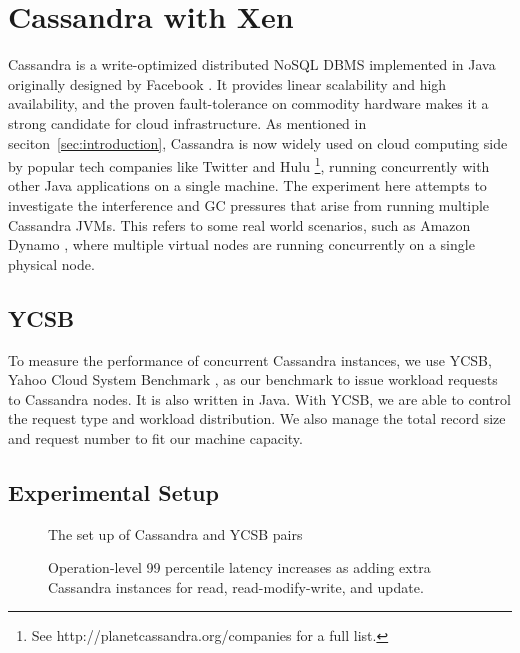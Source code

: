 \documentclass{sig-alternate}
\begin{document}
\section{Cassandra with Xen}

Cassandra is a write-optimized distributed NoSQL DBMS implemented in Java originally designed by Facebook \cite{lakshman2010cassandra}. It provides linear scalability and high availability, and the proven fault-tolerance on commodity hardware makes it a strong candidate for cloud infrastructure. As mentioned in seciton~\ref{sec:introduction}, Cassandra is now widely used on cloud computing side by popular tech companies like Twitter and Hulu \footnote{See http://planetcassandra.org/companies for a full list.}, running concurrently with other Java applications on a single machine. The experiment here attempts to investigate the interference and GC pressures that arise from running multiple Cassandra JVMs. This refers to some real world scenarios, such as Amazon Dynamo \cite{hastorun2007dynamo}, where multiple virtual nodes are running concurrently on a single physical node.

\subsection{YCSB}
To measure the performance of concurrent Cassandra instances, we use YCSB, Yahoo Cloud System Benchmark \cite{cooper2010benchmarking}, as our benchmark to issue workload requests to Cassandra nodes. It is also written in Java. With YCSB, we are able to control the request type and workload distribution. We also manage the total record size and request number to fit our machine capacity.

\subsection{Experimental Setup}
\begin{figure}
\centering
{}
\caption{The set up of Cassandra and YCSB pairs}
\label{fig:cassandrasetup}
\end{figure}

\begin{figure*}

\centering
{}
\caption{Operation-level 99 percentile latency increases as adding extra Cassandra instances for read, read-modify-write, and update.}
\label{fig:cassandraresults}
\end{figure*}
\end{document}
